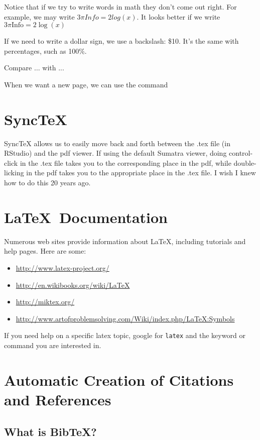 \documentclass[12pt]{article}
\begin{document}
Notice that if we try to write words in math they don't come out right. For example, we may write $3\pi Info = 2 log(x)$. It looks better if we write $3\pi \mbox{Info} = 2 \log(x)$

If we need to write a dollar sign, we use a backslash: \$10. It's the same with percentages, such as 100\%.

Compare $\ldots$ with ...

When we want a new page, we can use the command

\section{ SyncTeX}

SyncTeX allows us to easily move back and forth between the .tex file (in RStudio) and the pdf viewer. If using the default Sumatra viewer, doing control-click in the .tex file takes you to the corresponding place in the pdf, while double-licking in the pdf takes you to the appropriate place in the .tex file. I wish I knew how to do this 20 years ago. 

\section{\LaTeX\ Documentation}\label{docs}

Numerous web sites provide information about \LaTeX,
including tutorials and help pages. Here are some:

\begin{itemize}
\item \url{http://www.latex-project.org/}
\item \url{http://en.wikibooks.org/wiki/LaTeX}
\item \url{http://miktex.org/}
\item \url{http://www.artofproblemsolving.com/Wiki/index.php/LaTeX:Symbols}
\end{itemize}

If you need help on a specific latex topic, google for
\verb|latex| and the keyword or command you are interested in.



\section{Automatic Creation of Citations and References}


\subsection{What is BibTeX?}
\end{document}

